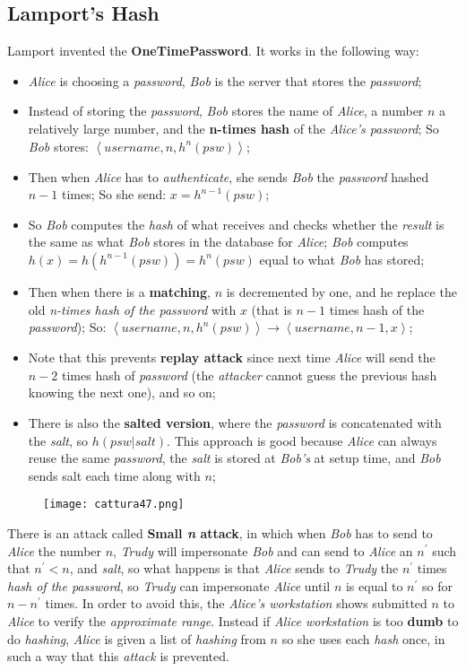 \documentclass{article}
\begin{document}
\subsection{Lamport's Hash}
Lamport invented the \textbf{OneTimePassword}. It works in the following way: 
\begin{itemize}
\item \emph{Alice} is choosing a \emph{password}, \emph{Bob} is the server that stores the \emph{password};
\item Instead of storing the \emph{password}, \emph{Bob} stores the name of \emph{Alice}, a number $n$ a relatively large number, and the\textbf{ n-times hash} of the \emph{Alice’s password};
\subitem So \emph{Bob} stores: $\left \langle username , n , h^n(psw) \right \rangle$;
\item Then when \emph{Alice} has to \emph{authenticate}, she sends \emph{Bob} the \emph{password} hashed $n-1$ times;
\subitem So she send: $x = h^{n-1}(psw)$;
\item So \emph{Bob} computes the \emph{hash} of what receives and checks whether the \emph{result} is the same as what \emph{Bob} stores in the database for \emph{Alice};
\subitem \emph{Bob} computes $h(x) = h( h^{n-1}(psw)) = h^n(psw)$ equal to what \emph{Bob} has stored;
\item Then when there is a \textbf{matching}, $n$ is decremented by one, and he replace the old \emph{n-times hash of the password} with $x$ (that is $n-1$ times hash of the \emph{password});
\subitem So: $\left \langle username , n , h^n(psw) \right \rangle \rightarrow \left \langle username , n-1 , x \right \rangle$;
\item Note that this prevents \textbf{replay attack} since next time \emph{Alice} will send the $n-2$ times hash of \emph{password} (the \emph{attacker} cannot guess the previous hash knowing the next one), and so on;
\item There is also the \textbf{salted version}, where the \emph{password} is concatenated with the \emph{salt}, so $h(psw|salt)$. This approach is good because \emph{Alice} can always reuse the same \emph{password}, the \emph{salt} is stored at \emph{Bob's} at setup time, and \emph{Bob} sends salt each time along with $n$; 
\end{itemize}
\begin{figure}[H]
  \centering
  \texttt{[image: cattura47.png]}
\end{figure}
There is an attack called \textbf{Small \emph{n} attack}, in which when \emph{Bob} has to send to \emph{Alice} the number $n$, \emph{Trudy} will impersonate \emph{Bob} and can send to \emph{Alice} an $n^{'}$ such that $n^{'}<n$, and \emph{salt}, so what happens is that \emph{Alice} sends to \emph{Trudy} the $n^{'}$ times \emph{hash of the password}, so \emph{Trudy} can impersonate \emph{Alice} until $n$ is equal to $n^{'}$ so for $n - n^{'}$ times. In order to avoid this, the \emph{Alice's workstation} shows submitted $n$ to \emph{Alice} to verify the \emph{approximate range}. Instead if \emph{Alice workstation} is too \textbf{dumb} to do \emph{hashing}, \emph{Alice} is given a list of \emph{hashing} from $n$ so she uses each \emph{hash} once, in such a way that this \emph{attack} is prevented. 
\clearpage
\end{document}
